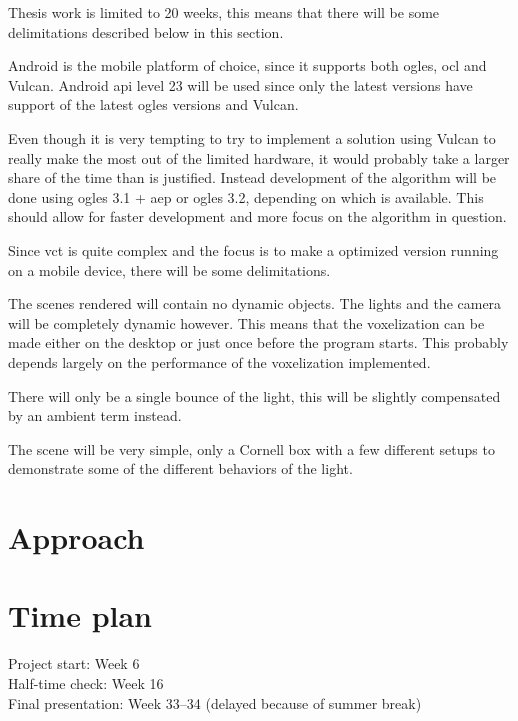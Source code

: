 \documentclass[a4paper, 12pt]{article}
\begin{document}
Thesis work is limited to 20 weeks, this means that there will be some delimitations described below in this section.

Android is the mobile platform of choice, since it supports both \gls{ogles}, \gls{ocl} and Vulcan. Android \acrshort{api} level 23 will be used since only the latest versions have support of the latest \gls{ogles} versions and Vulcan.

Even though it is very tempting to try to implement a solution using Vulcan to really make the most out of the limited hardware, it would probably take a larger share of the time than is justified. Instead development of the algorithm will be done using \gls{ogles} 3.1 + \gls{aep} or \gls{ogles} 3.2, depending on which is available. This should allow for faster development and more focus on the algorithm in question.


Since vct is quite complex and the focus is to make a optimized version running on a mobile device, there will be some delimitations.

The scenes rendered will contain no dynamic objects. The lights and the camera will be completely dynamic however. This means that the voxelization can be made either on the desktop or just once before the program starts. This probably depends largely on the performance of the voxelization implemented.

There will only be a single bounce of the light, this will be slightly compensated by an ambient term instead.

The scene will be very simple, only a Cornell box with a few different setups to demonstrate some of the different behaviors of the light.


\section{Approach}
\label{sec:Approach}


\section{Time plan}
\label{sec:Time plan}

Project start: Week 6 \\
Half-time check: Week 16 \\
Final presentation: Week 33--34 (delayed because of summer break)
\end{document}

